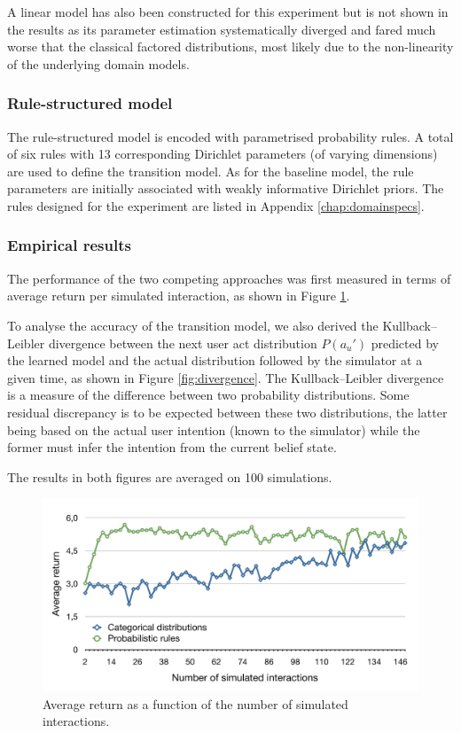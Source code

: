 A linear model has also been constructed for this experiment but is not shown in the results as its parameter estimation systematically diverged and fared much worse that the classical factored distributions, most likely due to the non-linearity of the underlying domain models. 


\subsubsection*{Rule-structured model}

The rule-structured model is encoded with parametrised probability rules. A total of six rules with 13 corresponding Dirichlet parameters (of varying dimensions) are used to define the transition model.   As for the baseline model, the rule parameters are initially associated with weakly informative Dirichlet priors.  The rules designed for the experiment are listed in Appendix \ref{chap:domainspecs}.

\subsubsection*{Empirical results}

The performance of the two competing approaches was first measured in terms of average return per simulated interaction, as shown in Figure \ref{fig:return_exp21}.  

To analyse the accuracy of the transition model, we also derived the Kullback--Leibler divergence between the next user act distribution $P(a_u')$ predicted by the learned model and the actual distribution followed by the simulator at a given time, as shown in Figure \ref{fig:divergence}.  The Kullback--Leibler divergence \citep{KLDIVERGE} is a measure of the difference between two probability distributions.  Some residual discrepancy is to be expected between these two distributions, the latter being based on the actual user intention (known to the simulator) while the former must infer the intention from the current belief state. 

The results in both figures are averaged on 100 simulations.

\begin{figure}[p]
\centering
\includegraphics[scale=0.42]{imgs/return_exp21.pdf}
\caption{Average return as a function of the number of simulated interactions.}
\label{fig:return_exp21}
\end{figure}

